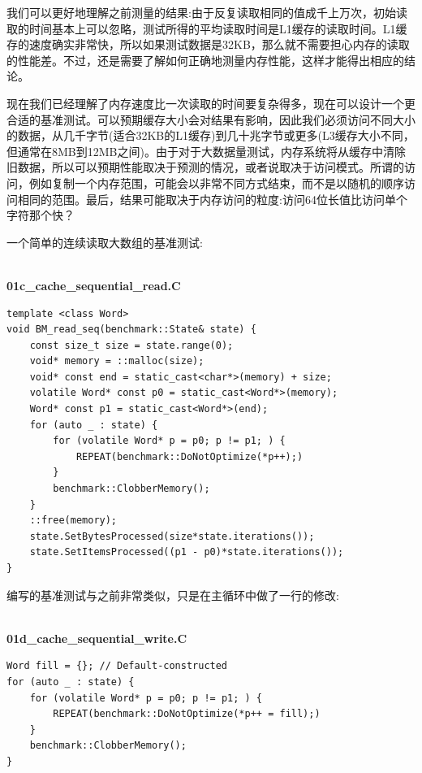 我们可以更好地理解之前测量的结果:由于反复读取相同的值成千上万次，初始读取的时间基本上可以忽略，测试所得的平均读取时间是L1缓存的读取时间。L1缓存的速度确实非常快，所以如果测试数据是32KB，那么就不需要担心内存的读取的性能差。不过，还是需要了解如何正确地测量内存性能，这样才能得出相应的结论。


现在我们已经理解了内存速度比一次读取的时间要复杂得多，现在可以设计一个更合适的基准测试。可以预期缓存大小会对结果有影响，因此我们必须访问不同大小的数据，从几千字节(适合32KB的L1缓存)到几十兆字节或更多(L3缓存大小不同，但通常在8MB到12MB之间)。由于对于大数据量测试，内存系统将从缓存中清除旧数据，所以可以预期性能取决于预测的情况，或者说取决于访问模式。所谓的访问，例如复制一个内存范围，可能会以非常不同方式结束，而不是以随机的顺序访问相同的范围。最后，结果可能取决于内存访问的粒度:访问64位长值比访问单个字符那个快？

一个简单的连续读取大数组的基准测试:

\hspace*{\fill} \\ %
\noindent
\textbf{01c\_cache\_sequential\_read.C}
\begin{lstlisting}[style=styleCXX]
template <class Word>
void BM_read_seq(benchmark::State& state) {
	const size_t size = state.range(0);
	void* memory = ::malloc(size);
	void* const end = static_cast<char*>(memory) + size;
	volatile Word* const p0 = static_cast<Word*>(memory);
	Word* const p1 = static_cast<Word*>(end);
	for (auto _ : state) {
		for (volatile Word* p = p0; p != p1; ) {
			REPEAT(benchmark::DoNotOptimize(*p++);)
		}
		benchmark::ClobberMemory();
	}
	::free(memory);
	state.SetBytesProcessed(size*state.iterations());
	state.SetItemsProcessed((p1 - p0)*state.iterations());
}
\end{lstlisting}

编写的基准测试与之前非常类似，只是在主循环中做了一行的修改:

\hspace*{\fill} \\ %
\noindent
\textbf{01d\_cache\_sequential\_write.C}
\begin{lstlisting}[style=styleCXX]
Word fill = {}; // Default-constructed
for (auto _ : state) {
	for (volatile Word* p = p0; p != p1; ) {
		REPEAT(benchmark::DoNotOptimize(*p++ = fill);)
	}
	benchmark::ClobberMemory();
}
\end{lstlisting}

